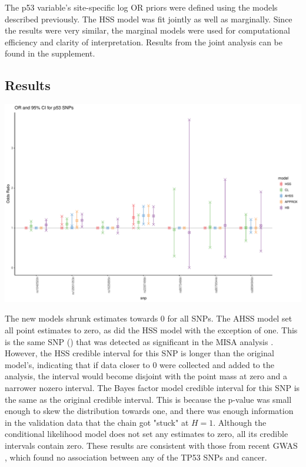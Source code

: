 \documentclass[AMA,STIX1COL]{WileyNJD-v2}\usepackage[]{graphicx}\usepackage[]{color}
\newenvironment{knitrout}{}{} %
\begin{document}
The p53 variable's site-specific log OR priors were defined using the models described previously. The HSS model was fit jointly as well as marginally. Since the results were very similar, the marginal models were used for computational efficiency and clarity of interpretation. Results from the joint analysis can be found in the supplement.

\subsection{Results}







\begin{knitrout}
\color{fgcolor}

{\centering \includegraphics[width=6in]{figure/unnamed-chunk-32-1} 

}



\end{knitrout}

The new models shrunk estimates towards 0 for all SNPs. The AHSS model set all point estimates to zero, as did the HSS model with the exception of one. This is the same SNP () 
that was detected as significant in the MISA analysis \cite{schildkraut2010association}. However, the HSS credible interval for this SNP is longer than the original model's, indicating that if data closer to 0 were collected and added to the analysis, the interval would become disjoint with the point mass at zero and a narrower nozero interval.  The Bayes factor model credible interval for this SNP is the same as the original credible interval. This is because the p-value was small enough to skew the distribution towards one, and there was enough information in the validation data that the chain got "stuck" at $H = 1$. Although the conditional likelihood model does not set any estimates to zero, all its credible intervals contain zero. These results are consistent with those from recent GWAS \cite{phelan2017identification}, which found no association between any of the TP53 SNPs and cancer.
\end{document}
